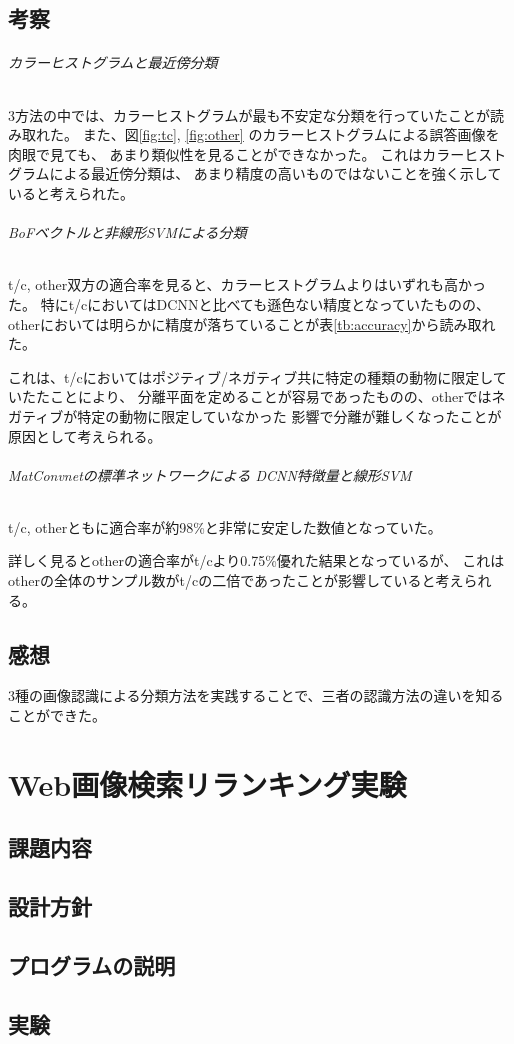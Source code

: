 \documentclass[11pt,a4paper, uplatex]{jsreport}
\begin{document}
\section{考察}
\subparagraph{カラーヒストグラムと最近傍分類}
3方法の中では、カラーヒストグラムが最も不安定な分類を行っていたことが読み取れた。
また、図\ref{fig:tc}, \ref{fig:other}
のカラーヒストグラムによる誤答画像を肉眼で見ても、
あまり類似性を見ることができなかった。
これはカラーヒストグラムによる最近傍分類は、
あまり精度の高いものではないことを強く示していると考えられた。

\subparagraph{BoFベクトルと非線形SVMによる分類}
t/c, other双方の適合率を見ると、カラーヒストグラムよりはいずれも高かった。
特にt/cにおいてはDCNNと比べても遜色ない精度となっていたものの、
otherにおいては明らかに精度が落ちていることが表\ref{tb:accuracy}から読み取れた。

これは、t/cにおいてはポジティブ/ネガティブ共に特定の種類の動物に限定していたたことにより、
分離平面を定めることが容易であったものの、otherではネガティブが特定の動物に限定していなかった
影響で分離が難しくなったことが原因として考えられる。

\subparagraph{MatConvnetの標準ネットワークによる DCNN特徴量と線形SVM}
t/c, otherともに適合率が約98\%と非常に安定した数値となっていた。

詳しく見るとotherの適合率がt/cより0.75\%優れた結果となっているが、
これはotherの全体のサンプル数がt/cの二倍であったことが影響していると考えられる。
\section{感想}
3種の画像認識による分類方法を実践することで、三者の認識方法の違いを知ることができた。
\chapter{Web画像検索リランキング実験}
\section{課題内容}
\section{設計方針}
\section{プログラムの説明}
\section{実験}
\end{document}
